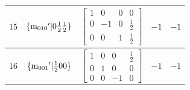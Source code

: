 \documentclass[fleqn,8pt]{jsarticle}
\begin{document}
\begin{longtable}{ccccc}
$ 15 $ & $ \{{\rm m}_{010}{}'|0 \frac{1}{2} \frac{1}{2}\} $ & $ \begin{bmatrix} 1 & 0 & 0 & 0 \\ 0 & -1 & 0 & \frac{1}{2} \\ 0 & 0 & 1 & \frac{1}{2} \end{bmatrix} $ & $ -1 $ & $ -1 $ \\ \hline
$ 16 $ & $ \{{\rm m}_{001}{}'|\frac{1}{2} 0 0\} $ & $ \begin{bmatrix} 1 & 0 & 0 & \frac{1}{2} \\ 0 & 1 & 0 & 0 \\ 0 & 0 & -1 & 0 \end{bmatrix} $ & $ -1 $ & $ -1 $ \\
\end{longtable}
\end{document}
